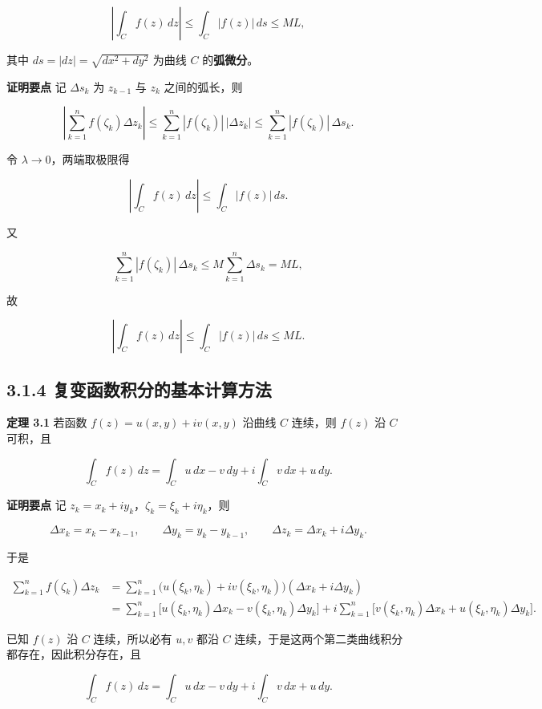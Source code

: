 \[
\left|\int_C f(z)\,dz\right|\le\int_C |f(z)|\,ds\le ML,
\]

其中 \(ds=|dz|=\sqrt{dx^2+dy^2}\) 为曲线 \(C\) 的\textbf{弧微分}。

\textbf{证明要点} 记 \(\Delta s_k\) 为 \(z_{k-1}\) 与 \(z_k\)
之间的弧长，则

\[
\left|\sum_{k=1}^{n}f(\zeta_k)\Delta z_k\right|
\le\sum_{k=1}^{n}|f(\zeta_k)|\,|\Delta z_k|
\le\sum_{k=1}^{n}|f(\zeta_k)|\,\Delta s_k .
\]

令 \(\lambda\to 0\)，两端取极限得

\[
\left|\int_C f(z)\,dz\right|\le\int_C |f(z)|\,ds .
\]

又

\[
\sum_{k=1}^{n}|f(\zeta_k)|\,\Delta s_k\le M\sum_{k=1}^{n}\Delta s_k=ML,
\]

故

\[
\left|\int_C f(z)\,dz\right|\le\int_C |f(z)|\,ds\le ML .
\]

\subsection{3.1.4
复变函数积分的基本计算方法}\label{ux590dux53d8ux51fdux6570ux79efux5206ux7684ux57faux672cux8ba1ux7b97ux65b9ux6cd5}

\textbf{定理 3.1} 若函数 \(f(z)=u(x,y)+iv(x,y)\) 沿曲线 \(C\) 连续，则
\(f(z)\) 沿 \(C\) 可积，且

\[
\int_C f(z)\,dz=\int_C u\,dx-v\,dy+i\int_C v\,dx+u\,dy .
\]

\textbf{证明要点} 记 \(z_k=x_k+iy_k\)，\(\zeta_k=\xi_k+i\eta_k\)，则

\[
\Delta x_k=x_k-x_{k-1},\qquad \Delta y_k=y_k-y_{k-1},\qquad \Delta z_k=\Delta x_k+i\Delta y_k .
\]

于是

\[
\begin{aligned}
\sum_{k=1}^{n}f(\zeta_k)\Delta z_k
&=\sum_{k=1}^{n}\bigl(u(\xi_k,\eta_k)+iv(\xi_k,\eta_k)\bigr)(\Delta x_k+i\Delta y_k)\\
&=\sum_{k=1}^{n}\bigl[u(\xi_k,\eta_k)\Delta x_k-v(\xi_k,\eta_k)\Delta y_k\bigr]
+i\sum_{k=1}^{n}\bigl[v(\xi_k,\eta_k)\Delta x_k+u(\xi_k,\eta_k)\Delta y_k\bigr].
\end{aligned}
\]

已知 \(f(z)\) 沿 \(C\) 连续，所以必有 \(u,v\) 都沿 \(C\)
连续，于是这两个第二类曲线积分都存在，因此积分存在，且

\[
\int_C f(z)\,dz=\int_C u\,dx-v\,dy+i\int_C v\,dx+u\,dy .
\]

